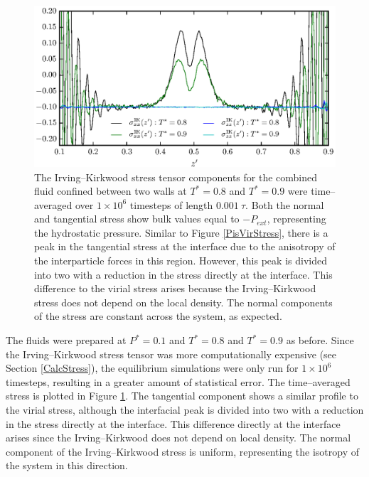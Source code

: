 \begin{figure}[h!]
\centering
\includegraphics[scale=1.0]{PisIKStress}
\caption{The Irving--Kirkwood stress tensor components for the combined fluid confined between two walls at $T^{*} = 0.8$ and $T^{*} = 0.9$ were time--averaged over $1 \times 10^{6}$ timesteps of length $0.001\ \tau$.
Both the normal and tangential stress show bulk values equal to $-P_{ext}$, representing the hydrostatic pressure.
Similar to Figure \ref{PisVirStress}, there is a peak in the tangential stress at the interface due to the anisotropy of the interparticle forces in this region.
However, this peak is divided into two with a reduction in the stress directly at the interface.
This difference to the virial stress arises because the Irving--Kirkwood stress does not depend on the local density. 
The normal components of the stress are constant across the system, as expected.
}
\label{PisIKStress}
\end{figure}
\FloatBarrier 
The fluids were prepared at $P^{*}=0.1$ and $T^{*}=0.8$ and $T^{*}=0.9$ as before.
Since the Irving--Kirkwood stress tensor was more computationally expensive (see Section \ref{CalcStress}), the equilibrium simulations were only run for $1 \times 10^{6}$ timesteps, resulting in a greater amount of statistical error.
The time--averaged stress is plotted in Figure \ref{PisIKStress}.
The tangential component shows a similar profile to the virial stress, although the interfacial peak is divided into two with a reduction in the stress directly at the interface.
This difference directly at the interface arises since the Irving--Kirkwood does not depend on local density.
The normal component of the Irving--Kirkwood stress is uniform, representing the isotropy of the system in this direction.
\FloatBarrier

